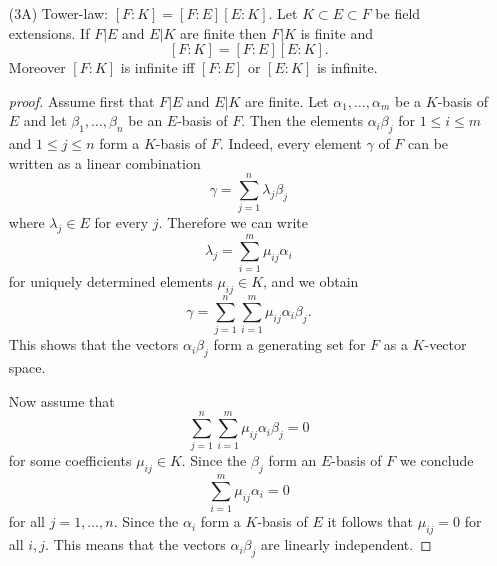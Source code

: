 \documentclass[]{scrartcl}
\newcommand{\<}{\trianglelefteq}
\begin{document}
\begin{itemize}
	\begin{proof}[proof sketch]
	\end{proof}
	\item[(3A)] Tower-law: $[F \colon K] = [F\colon E][E\colon K]$. Let $ K \subset E \subset F $ be field extensions. If $ F|E $ and $ E|K $ are finite then $ F|K $ is finite and 
	$$
	[F:K] = [F:E][E:K]. 
	$$
	Moreover $ [F:K] $ is infinite iff $ [F:E] $ or $ [E:K] $ is infinite.  
\begin{proof}[proof]
	Assume first that $ F|E $ and $ E|K $ are finite. Let $ \alpha_1, \dots, \alpha_m $ be a $ K $-basis of $ E $ 
	and let $ \beta_1, \dots, \beta_n $ be an $ E $-basis of $ F $. Then the elements $ \alpha_i \beta_j $ for $ 1 \leq i \leq m $ 
	and $ 1 \leq j \leq n $ form a $ K $-basis of $ F $. Indeed, every element $ \gamma $ of $ F $ can be written as a linear combination 
	$$
	\gamma = \sum_{j = 1}^n \lambda_j \beta_j
	$$
	where $ \lambda_j \in E $ for every $ j $. Therefore we can write 
	$$
	\lambda_j = \sum_{i = 1}^m \mu_{ij} \alpha_i
	$$
	for uniquely determined elements $ \mu_{ij} \in K $, and we obtain 
	$$
	\gamma = \sum_{j = 1}^n \sum_{i = 1}^m \mu_{ij} \alpha_i \beta_j. 
	$$
	This shows that the vectors $ \alpha_i \beta_j $ form a generating set for $ F $ as a $ K $-vector space. 
	
	Now assume that 
	$$
	\sum_{j = 1}^n \sum_{i = 1}^m \mu_{ij} \alpha_i \beta_j = 0 
	$$
	for some coefficients $ \mu_{ij} \in K $. Since the $ \beta_j $ form an $ E $-basis of $ F $ we conclude 
	$$
	\sum_{i = 1}^m \mu_{ij} \alpha_i = 0 
	$$
	for all $ j = 1, \dots, n $. Since the $ \alpha_i $ form a $ K $-basis of $ E $ it follows that $ \mu_{ij} = 0 $ 
	for all $ i, j $. This means that the vectors $ \alpha_i \beta_j $ are linearly independent.
	

\end{proof}
\end{itemize}
\end{document}
